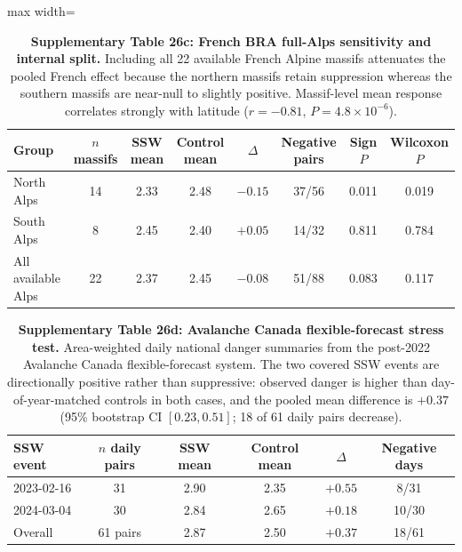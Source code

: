 \documentclass[11pt,letterpaper]{article}
\begin{document}
\begin{table}[!ht]
\centering
\caption{\textbf{Supplementary Table 26c: French BRA full-Alps sensitivity and internal split.}
Including all 22 available French Alpine massifs attenuates the pooled French effect because the northern massifs retain suppression whereas the southern massifs are near-null to slightly positive. Massif-level mean response correlates strongly with latitude ($r = -0.81$, $P = 4.8 \times 10^{-6}$).}
\label{tab:french_bra_split}
\small
\begin{adjustbox}{max width=\textwidth}
\begin{tabular}{lccccccc}
\toprule
Group & $n$ massifs & SSW mean & Control mean & $\Delta$ & Negative pairs & Sign $P$ & Wilcoxon $P$ \\
\midrule
North Alps & 14 & 2.33 & 2.48 & $-0.15$ & 37/56 & 0.011 & 0.019 \\
South Alps & 8 & 2.45 & 2.40 & $+0.05$ & 14/32 & 0.811 & 0.784 \\
All available Alps & 22 & 2.37 & 2.45 & $-0.08$ & 51/88 & 0.083 & 0.117 \\
\bottomrule
\end{tabular}
\end{adjustbox}
\end{table}

\begin{table}[!ht]
\centering
\caption{\textbf{Supplementary Table 26d: Avalanche Canada flexible-forecast stress test.}
Area-weighted daily national danger summaries from the post-2022 Avalanche Canada flexible-forecast system. The two covered SSW events are directionally positive rather than suppressive: observed danger is higher than day-of-year-matched controls in both cases, and the pooled mean difference is $+0.37$ (95\% bootstrap CI $[0.23, 0.51]$; 18 of 61 daily pairs decrease).}
\label{tab:avcan_flexible}
\small
\begin{tabular}{lccccc}
\toprule
SSW event & $n$ daily pairs & SSW mean & Control mean & $\Delta$ & Negative days \\
\midrule
2023-02-16 & 31 & 2.90 & 2.35 & $+0.55$ & 8/31 \\
2024-03-04 & 30 & 2.84 & 2.65 & $+0.18$ & 10/30 \\
\midrule
Overall & 61 pairs & 2.87 & 2.50 & $+0.37$ & 18/61 \\
\bottomrule
\end{tabular}
\end{table}
\end{document}
